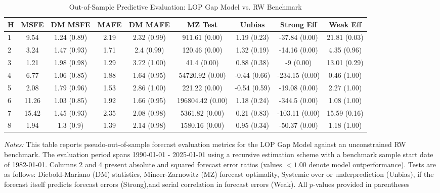 \begin{table}[htbp]
\centering
\caption{Out-of-Sample Predictive Evaluation: LOP Gap Model vs. RW Benchmark}
\label{tab:lop_gap_model_evaluation}
\footnotesize
\begin{tabular}{l cccccccc}
\hline\hline
\rule{0pt}{3ex}
\textbf{H} & \textbf{MSFE} & \textbf{DM MSFE} & \textbf{MAFE} & \textbf{DM MAFE} & \textbf{MZ Test} & \textbf{Unbias} & \textbf{Strong Eff} & \textbf{Weak Eff} \\[0.5ex]
\hline
\rule{0pt}{2.5ex}
1 & 9.54 & 1.24 (0.89) & 2.19 & 2.32 (0.99) & 911.61 (0.00) & 1.19 (0.23) & -37.84 (0.00) & 21.81 (0.03) \\
2 & 3.24 & 1.47 (0.93) & 1.71 & 2.4 (0.99) & 120.46 (0.00) & 1.32 (0.19) & -14.16 (0.00) & 4.35 (0.96) \\
3 & 1.21 & 1.98 (0.98) & 1.29 & 3.72 (1.00) & 41.4 (0.00) & 0.88 (0.38) & -9 (0.00) & 13.01 (0.29) \\
4 & 6.77 & 1.06 (0.85) & 1.88 & 1.64 (0.95) & 54720.92 (0.00) & -0.44 (0.66) & -234.15 (0.00) & 0.46 (1.00) \\
5 & 2.08 & 1.79 (0.96) & 1.53 & 2.86 (1.00) & 221.22 (0.00) & -0.54 (0.59) & -19.08 (0.00) & 2.27 (1.00) \\
6 & 11.26 & 1.03 (0.85) & 1.92 & 1.66 (0.95) & 196804.42 (0.00) & 1.18 (0.24) & -344.5 (0.00) & 1.08 (1.00) \\
7 & 15.42 & 1.45 (0.93) & 2.35 & 2.08 (0.98) & 5361.82 (0.00) & 0.21 (0.83) & -103.11 (0.00) & 15.59 (0.16) \\
8 & 1.94 & 1.3 (0.9) & 1.39 & 2.14 (0.98) & 1580.16 (0.00) & 0.95 (0.34) & -50.37 (0.00) & 1.18 (1.00) \\
\hline\hline
\end{tabular}%
\par\smallskip
\parbox{\textwidth}{\scriptsize \textit{Notes:} This table reports pseudo-out-of-sample forecast evaluation metrics for the LOP Gap Model against an unconstrained RW benchmark. The evaluation period spans 1990-01-01 - 2025-01-01 using a recursive estimation scheme with a benchmark sample start date of 1982-01-01. Columns 2 and 4 present absolute and squared forecast error ratios (values $< 1.00$ denote model outperformance). Tests are as follows: Diebold-Mariano (DM) statistics, Mincer-Zarnowitz (MZ) forecast optimality, Systemic over or underprediction (Unbias), if the forecast itself predicts forecast errors (Strong),and serial correlation in forecast errors (Weak). All $p$-values provided in parentheses}
\end{table}
